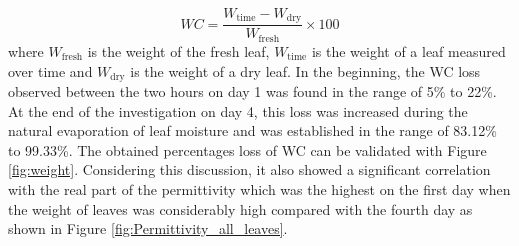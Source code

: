 \documentclass[journal,article,submit,moreauthors,pdftex]{Definitions/mdpi}
\renewcommand{\^}{\hat}  %
\begin{document}
\begin{equation}
	WC = \frac{W_{\mathrm{time}} - W_{\mathrm{dry}}}{W_{\mathrm{fresh}}} \times 100%
	\label{eq:WC}
\end{equation}
where $W_{\mathrm{fresh}}$ is the weight of the fresh leaf, $W_{\mathrm{time}}$ is the weight of a leaf measured over time and $W_{\mathrm{dry}}$ is the weight of a dry leaf. In the beginning, the WC loss observed between the two hours on day 1 was found in the range of 5\% to 22\%. At the end of the investigation on day 4, this loss was increased during the natural evaporation of leaf moisture and was established in the range of 83.12\% to 99.33\%.
The obtained percentages loss of WC can be validated with Figure \ref{fig:weight}. Considering this discussion, it also showed a significant correlation with the real part of the permittivity which was the highest on the first day when the weight of leaves was considerably high compared with the fourth day as shown in Figure \ref{fig:Permittivity_all_leaves}.
\end{document}
